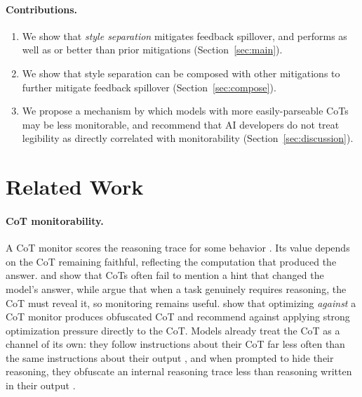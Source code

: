 \documentclass{article}
\begin{document}
\paragraph{Contributions.}
\begin{enumerate}
\item We show that \emph{style separation} mitigates feedback spillover, and performs as well as or better than prior mitigations (Section~\ref{sec:main}).
\item We show that style separation can be composed with other mitigations to further mitigate feedback spillover (Section~\ref{sec:compose}).
\item We propose a mechanism by which models with more easily-parseable CoTs may be less monitorable, and recommend that AI developers do not treat legibility as directly correlated with monitorability (Section~\ref{sec:discussion}).
\end{enumerate}

\section{Related Work}
\label{sec:related}

\paragraph{CoT monitorability.} A CoT monitor scores the reasoning trace for some behavior \citep{korbak2025monitorability}. Its value depends on the CoT remaining faithful, reflecting the computation that produced the answer. \citet{turpin2023unfaithful} and \citet{chen2025reasoning} show that CoTs often fail to mention a hint that changed the model's answer, while \citet{emmons2025chainofthought} argue that when a task genuinely requires reasoning, the CoT must reveal it, so monitoring remains useful. \citet{baker2025monitoring} show that optimizing \emph{against} a CoT monitor produces obfuscated CoT and recommend against applying strong optimization pressure directly to the CoT. Models already treat the CoT as a channel of its own: they follow instructions about their CoT far less often than the same instructions about their output \citep{chen2026controllability}, and when prompted to hide their reasoning, they obfuscate an internal reasoning trace less than reasoning written in their output \citep{zolkowski2025obfuscate}.
\end{document}
